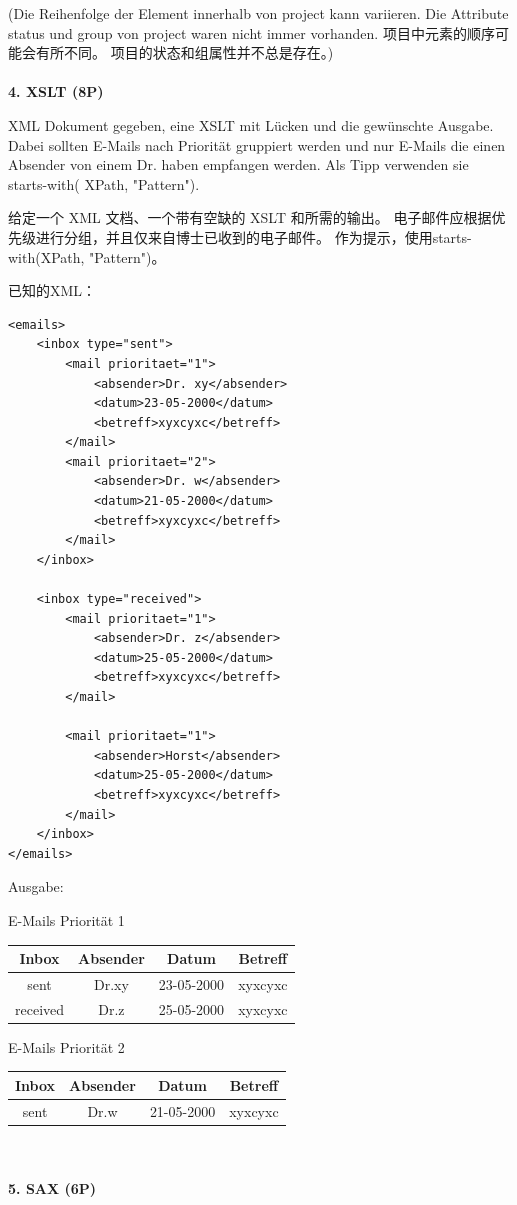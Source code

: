 \documentclass[fontset=windows]{article}
\begin{document}
(Die Reihenfolge der Element innerhalb von project kann variieren. Die Attribute status und group von project waren nicht immer vorhanden. 项目中元素的顺序可能会有所不同。 项目的状态和组属性并不总是存在。)
\\
\\
\textbf{4. XSLT (8P)}

XML Dokument gegeben, eine XSLT mit Lücken und die gewünschte Ausgabe. Dabei sollten E-Mails nach Priorität gruppiert werden und nur E-Mails die einen Absender von einem Dr. haben empfangen werden. Als Tipp verwenden sie starts-with( XPath, "Pattern").

给定一个 XML 文档、一个带有空缺的 XSLT 和所需的输出。 
电子邮件应根据优先级进行分组，并且仅来自博士已收到的电子邮件。 
作为提示，使用starts-with(XPath, "Pattern")。

已知的XML：

\begin{verbatim}
<emails>
	<inbox type="sent">
		<mail prioritaet="1">
			<absender>Dr. xy</absender>
			<datum>23-05-2000</datum>
			<betreff>xyxcyxc</betreff>
		</mail>
		<mail prioritaet="2">
			<absender>Dr. w</absender>
			<datum>21-05-2000</datum>
			<betreff>xyxcyxc</betreff>
		</mail>
	</inbox>

	<inbox type="received">
		<mail prioritaet="1">
			<absender>Dr. z</absender>
			<datum>25-05-2000</datum>
			<betreff>xyxcyxc</betreff>
		</mail>
		
		<mail prioritaet="1">
			<absender>Horst</absender>
			<datum>25-05-2000</datum>
			<betreff>xyxcyxc</betreff>
		</mail>
	</inbox>
</emails>
\end{verbatim}

Ausgabe:

E-Mails Priorität 1

\begin{tabular}{|c|c|c|c|}
	\hline
	Inbox & Absender&Datum&Betreff\\
	\hline
	sent&Dr.xy&23-05-2000&xyxcyxc\\
	\hline
	received&Dr.z&25-05-2000&xyxcyxc\\
	\hline
\end{tabular}

E-Mails Priorität 2

\begin{tabular}{|c|c|c|c|}
	\hline
	Inbox & Absender&Datum&Betreff\\
	\hline
	sent&Dr.w&21-05-2000&xyxcyxc\\
	\hline
\end{tabular}
\\
\\
\textbf{5. SAX (6P)}
\end{document}
